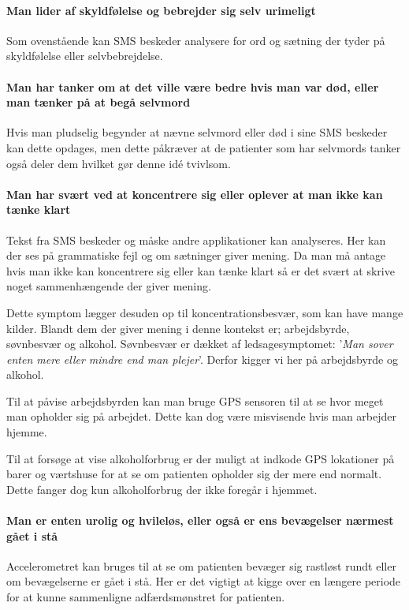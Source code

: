\paragraph{Man lider af skyldfølelse og bebrejder sig selv urimeligt}
Som ovenstående kan SMS beskeder analysere for ord og sætning der tyder på skyldfølelse eller selvbebrejdelse.

\paragraph{Man har tanker om at det ville være bedre hvis man var død, eller man tænker på at begå selvmord}
Hvis man pludselig begynder at nævne selvmord eller død i sine SMS beskeder kan dette opdages, men dette påkræver at de patienter som har selvmords tanker også deler dem hvilket gør denne idé tvivlsom.

\paragraph{Man har svært ved at koncentrere sig eller oplever at man ikke kan tænke klart}
Tekst fra SMS beskeder og måske andre applikationer kan analyseres. Her kan der ses på grammatiske fejl og om sætninger giver mening. Da man må antage hvis man ikke kan koncentrere sig eller kan tænke klart så er det svært at skrive noget sammenhængende der giver mening.

Dette symptom lægger desuden op til koncentrationsbesvær, som kan have mange kilder. Blandt dem der giver mening i denne kontekst er; arbejdsbyrde, søvnbesvær og alkohol.\cite{koncentration}
Søvnbesvær er dækket af ledsagesymptomet: '\textit{Man sover enten mere eller mindre end man plejer}'. Derfor kigger vi her på arbejdsbyrde og alkohol.

Til at påvise arbejdsbyrden kan man bruge GPS sensoren til at se hvor meget man opholder sig på arbejdet. Dette kan dog være misvisende hvis man arbejder hjemme.

Til at forsøge at vise alkoholforbrug er der muligt at indkode GPS lokationer på barer og værtshuse for at se om patienten opholder sig der mere end normalt.
Dette fanger dog kun alkoholforbrug der ikke foregår i hjemmet.

\paragraph{Man er enten urolig og hvileløs, eller også er ens bevægelser nærmest gået i stå}
Accelerometret kan bruges til at se om patienten bevæger sig rastløst rundt eller om bevægelserne er gået i stå.
Her er det vigtigt at kigge over en længere periode for at kunne sammenligne adfærdsmønstret for patienten.


